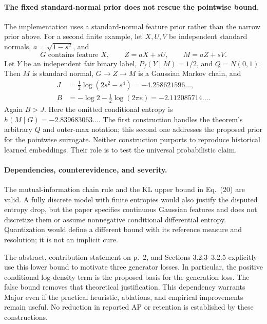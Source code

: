\documentclass[10pt]{article}
\begin{document}
\paragraph*{The fixed standard-normal prior does not rescue the pointwise bound.}\mbox{}\par
The implementation uses a standard-normal feature prior rather than the narrow prior above. For a second finite example, let \(X,U,V\) be independent standard normals, \(a=\sqrt{1-s^2}\), and \[G\text{ contains feature }X,\qquad Z=aX+sU,\qquad M=aZ+sV.\] Let \(Y\) be an independent fair binary label, \(P_f(Y\mid M)=1/2\), and \(Q=N(0,1)\). Then \(M\) is standard normal, \(G\to Z\to M\) is a Gaussian Markov chain, and \[\begin{aligned}
J&=\tfrac12\log(2s^2-s^4)=-4.258621596\ldots,\\
B&=-\log2-\tfrac12\log(2\pi e)=-2.112085714\ldots.\end{aligned}\] Again \(B>J\). Here the omitted conditional entropy is \(h(M\mid G)=-2.839683063\ldots\). The first construction handles the theorem’s arbitrary \(Q\) and outer-max notation; this second one addresses the proposed prior for the pointwise surrogate. Neither construction purports to reproduce historical learned embeddings. Their role is to test the universal probabilistic claim.\par
\paragraph*{Dependencies, counterevidence, and severity.}\mbox{}\par
The mutual-information chain rule and the KL upper bound in Eq. (20) are valid. A fully discrete model with finite entropies would also justify the disputed entropy drop, but the paper specifies continuous Gaussian features and does not discretize them or assume nonnegative conditional differential entropy. Quantization would define a different bound with its reference measure and resolution; it is not an implicit cure.\par
The abstract, contribution statement on p. 2, and Sections 3.2.3–3.2.5 explicitly use this lower bound to motivate three generator losses. In particular, the positive conditional log-density term is the proposed basis for the generation loss. The false bound removes that theoretical justification. This dependency warrants Major even if the practical heuristic, ablations, and empirical improvements remain useful. No reduction in reported AP or retention is established by these constructions.\par
\end{document}
